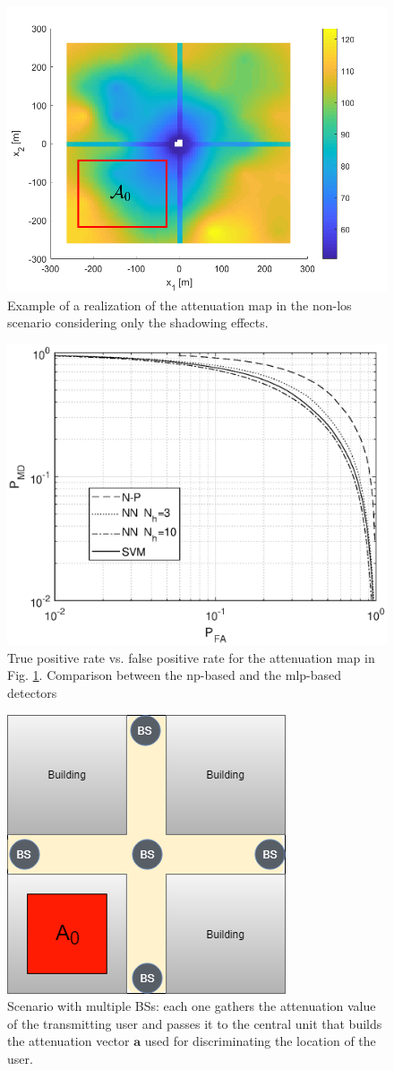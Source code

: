 \documentclass[draftcls,onecolumn,12pt]{IEEEtran}
\begin{document}
\begin{figure}
    \centering
    \includegraphics[width=0.5\columnwidth]{surfColorato.png}
    \caption{Example of a realization of the attenuation map in the non-\ac{los} scenario considering only the shadowing effects.}
    \label{fig:map}
\end{figure}


\begin{figure}
    \centering
    \includegraphics[width=0.5\columnwidth]{res_NP_approx_SVM.eps}
    \caption{True positive rate vs. false positive rate for the attenuation map in Fig. \ref{fig:map}. Comparison between the \ac{np}-based and the \ac{mlp}-based detectors}
    \label{fig:trueMap}
\end{figure}

\begin{figure}
    \centering
    \includegraphics[width=0.3\columnwidth]{scenario2.png}
    \caption{Scenario with multiple BSs: each one gathers the attenuation value of the transmitting user and passes it to the central unit that builds the attenuation vector $\bm{a}$ used for discriminating the location of the user.}
    \label{fig:mBS}
\end{figure}
\end{document}
